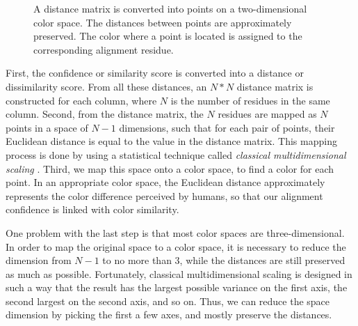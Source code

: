 \begin{figure}[hbt]
\caption[Conversion from Distance Matrix into Colors]{A distance matrix is converted into points on a two-dimensional color space. The distances between points are approximately preserved. The color where a point is located is assigned to the corresponding alignment residue.}\label{fig:chap2_color}
\end{figure}

First, the confidence or similarity score is converted into a distance or dissimilarity score. From all these distances, an $N*N$ distance matrix is constructed for each column, where $N$ is the number of residues in the same column. Second, from the distance matrix, the $N$ residues are mapped as $N$ points in a space of $N-1$ dimensions, such that for each pair of points, their Euclidean distance is equal to the value in the distance matrix. This mapping process is done by using a statistical technique called \emph{classical multidimensional scaling} \cite{Borg:1997aa}. Third, we map this space onto a color space, to find a color for each point. In an appropriate color space, the Euclidean distance approximately represents the color difference perceived by humans, so that our alignment confidence is linked with color similarity.

One problem with the last step is that most color spaces are three-dimensional. In order to map the original space to a color space, it is necessary to reduce the dimension from $N-1$ to no more than 3, while the distances are still preserved as much as possible. Fortunately, classical multidimensional scaling is designed in such a way that the result has the largest possible variance on the first axis, the second largest on the second axis, and so on. Thus, we can reduce the space dimension by picking the first a few axes, and mostly preserve the distances.


